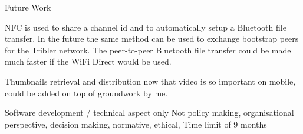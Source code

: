 Future Work

NFC is used to share a channel id and to automatically setup a Bluetooth file transfer.
In the future the same method can be used to exchange bootstrap peers for the Tribler network.
The peer-to-peer Bluetooth file transfer could be made much faster if the WiFi Direct would be used.


Thumbnails retrieval and distribution now that video is so important on mobile, could be added on top of groundwork by me.


Software development / technical aspect only
Not policy making, organisational perspective, decision making, normative, ethical,
Time limit of 9 months
